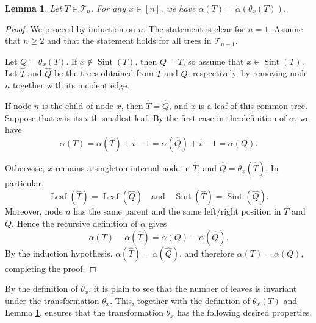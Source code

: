 \documentclass[12pt]{article}
\numberwithin{equation}{section}
\theoremstyle{plain}
\newtheorem{lemma}[theorem]{Lemma}
\def\B{\mathcal{T}}
\begin{document}
	 	
	 	\begin{lemma}\label{lem-alpha}
	 		Let $T\in \B_n$. For any $x\in [n]$, we have 
	 		$\alpha(T)=\alpha(\theta_x(T))$. 
	 	\end{lemma}
	 \begin{proof}
	 	We proceed by induction on $n$. The statement is clear for $n=1$.
	 	Assume that $n\geq 2$ and that the statement holds for all trees
	 	in $\mathcal T_{n-1}$.
	 	
	 	Let $Q=\theta_x(T)$. If $x\notin\operatorname{Sint}(T)$, then
	 	$Q=T$, so assume that $x\in\operatorname{Sint}(T)$.
	 	Let $\widehat T$ and $\widehat Q$ be the trees obtained from
	 	$T$ and $Q$, respectively, by removing node $n$ together with
	 	its incident edge.
	 	
	 	If node $n$ is the child of node $x$, then
	 	$\widehat T=\widehat Q$, and $x$ is a leaf of this common tree.
	 	Suppose that $x$ is its $i$-th smallest leaf. By the first case
	 	in the definition of $\alpha$, we have
	 	\[
	 	\alpha(T)=\alpha(\widehat T)+i-1
	 	=\alpha(\widehat Q)+i-1=\alpha(Q).
	 	\]
	 	
	 	Otherwise, $x$ remains a singleton internal node in $\widehat T$,
	 	and $\widehat Q=\theta_x(\widehat T)$. In particular,
	 	\[
	 	\operatorname{Leaf}(\widehat T)
	 	=\operatorname{Leaf}(\widehat Q)
	 	\quad\text{and}\quad
	 	\operatorname{Sint}(\widehat T)
	 	=\operatorname{Sint}(\widehat Q).
	 	\]
	 	Moreover, node $n$ has the same parent and the same left/right
	 	position in $T$ and $Q$. Hence the recursive definition of
	 	$\alpha$ gives
	 	\[
	 	\alpha(T)-\alpha(\widehat T)
	 	=
	 	\alpha(Q)-\alpha(\widehat Q).
	 	\]
	 	By the induction hypothesis,
	 	$\alpha(\widehat T)=\alpha(\widehat Q)$, and therefore
	 	$\alpha(T)=\alpha(Q)$, completing the proof.
	 \end{proof}
	 By the definition of $\theta_x$, it is plain to see that the number of leaves is invariant under the transformation $\theta_x$. This, together with the definition of $\theta_x(T)$ and Lemma \ref{lem-alpha}, ensures that the transformation $\theta_x$ has the following desired properties.
	 	
\end{document}
